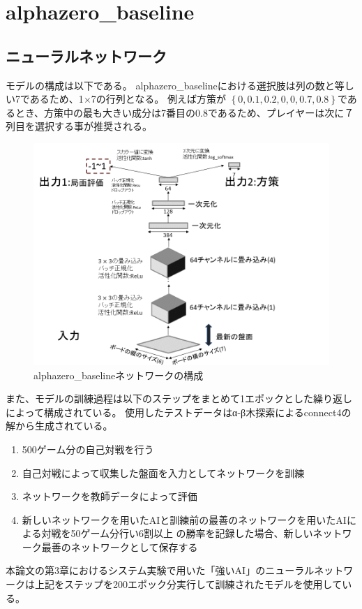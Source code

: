 \chapter{alphazero\_baseline}
\label{chap:baseline}
\section{ニューラルネットワーク}
モデルの構成は以下である。
alphazero\_baselineにおける選択肢は列の数と等しい7であるため、1$\times$7の行列となる。
例えば方策が
$\left\{0, 0.1, 0.2, 0, 0, 0.7, 0.8\right\}$であるとき、方策中の最も大きい成分は7番目の0.8であるため、プレイヤーは次に７列目を選択する事が推奨される。
\begin{figure}[t]
	\centering
	\includegraphics[width=\linewidth]{./figure/baselineNetwork.png}
	\caption{alphazero\_baselineネットワークの構成}
	\label{fig:baselineNetwork}
\end{figure}
また、モデルの訓練過程は以下のステップをまとめて1エポックとした繰り返しによって構成されている。
使用したテストデータ\cite{dataset}はα-β木探索によるconnect4の解から生成されている\cite{scoring}。
\begin{enumerate}
	\item 500ゲーム分の自己対戦を行う
	\item 自己対戦によって収集した盤面を入力としてネットワークを訓練
    \item ネットワークを教師データによって評価
    \item 新しいネットワークを用いたAIと訓練前の最善のネットワークを用いたAIによる対戦を50ゲーム分行い6割以上
    の勝率を記録した場合、新しいネットワーク最善のネットワークとして保存する

\end{enumerate}
本論文の第3章におけるシステム実験で用いた「強いAI」のニューラルネットワークは上記をステップを200エポック分実行して訓練されたモデルを使用している。

